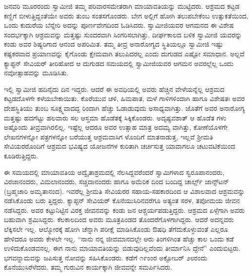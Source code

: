 ಜನವರಿ ಮೂರರಂದು ಸ್ವಾಮೀಜಿ ತಮ್ಮ ಪರಿವಾರಸಮೇತರಾಗಿ ಮಾಯಾವತಿಯನ್ನು ಮುಟ್ಟಿದರು. ಆಶ್ರಮದ ಕಟ್ಟಡ ಕಣ್ಣಿಗೆ ಬೀಳುತ್ತಿದ್ದಂತೆಯೇ ಅವರು ತುಂಬ ಸಂತಸಗೊಂಡರು. ಬೇಗ ಅಲ್ಲಿಗೆ ಹೋಗಿ ತಲುಪಬೇಕೆಂಬ ಉತ್ಸುಕತೆಯಿಂದ, ಒಂದು ಕುದುರೆಯ ಬೆನ್ನೇರಿ ಅದನ್ನು ಪೂರ್ಣವೇಗದಿಂದ ಓಡಿಸಿದರು. ಸ್ವಾಮೀಜಿಯವರ ಆಗಮನದ ಈ ವಿಶೇಷ ಸಂದರ್ಭಕ್ಕಾಗಿ ಆಶ್ರಮವನ್ನು ಮತ್ತಷ್ಟು ಸುಂದರವಾಗಿ ಸಿಂಗರಿಸಲಾಗಿತ್ತು. ದೀರ್ಘಕಾಲದ ಬಳಿಕ ಸ್ವಾಮೀಜಿ ಯವರನ್ನು ಕಂಡು ಅವರ ಶಿಷ್ಯರಿಗಾದ ಆನಂದ ಅಪರಿಮಿತ. ತಮ್ಮ ತೀವ್ರ ಅನಾರೋಗ್ಯದ ಸ್ಥಿತಿಯಲ್ಲೂ ಸ್ವಾಮೀಜಿ ಇಷ್ಟು ಕಷ್ಟಕರವಾದ ಪ್ರಯಾಣವನ್ನು ಕೈಗೊಂಡು ಕ್ಷೇಮವಾಗಿ ತಲುಪಿದರಲ್ಲ ಎಂದು ದುಗುಡದ ಎಷ್ಟೋ ಸಮಾಧಾನ. ಅಲ್ಲದೆ ಕ್ಯಾಪ್ಟನ್ ಸೇವಿಯರ್ ತೀರಿಹೋದ ಆ ದುಗುಡದ ಸಮಯದಲ್ಲಿ ಸ್ವಾಮೀಜಿಯವರ ಆಗಮನ ಅವರಲ್ಲೆಲ್ಲ ಒಂದು ನವೋತ್ಸಾಹವನ್ನು ಮೂಡಿಸಿತು.

ಇಲ್ಲಿ ಸ್ವಾಮೀಜಿ ಹದಿನೈದು ದಿನ ಇದ್ದರು. ಆದರೆ ಈ ಅವಧಿಯಲ್ಲಿ ಅವರು ಹೆಚ್ಚಿನ ವೇಳೆಯನ್ನೆಲ್ಲ ಆಶ್ರಮದ ಕಟ್ಟಡದೊಳಗೇ ಕಳೆಯಬೇಕಾಯಿತು. ಕೊರೆಯುವ ಚಳಿ, ಹಿಮಪಾತ, ಮಳೆ ಗಾಳಿಗಳಿಂದಾಗಿ ಹಾಗೂ ವಿಶೇಷತಃ ಅವರ ದೇಹಸ್ಥಿತಿಯು ತುಂಬ ಸೂಕ್ಷ್ಮವಾದದ್ದ ರಿಂದಾಗಿ ಹೆಚ್ಚು ಓಡಾಡುವುದು ಅಸಾಧ್ಯವಾಗಿತ್ತು. ಜೊತೆಗೆ ಅವರ ಅನಾರೋಗ್ಯ ಮತ್ತಷ್ಟು ಹದಗೆಟ್ಟು ಹಲವಾರು ಸಲ ಆಸ್ತಮಾ ಹೊಡೆತಕ್ಕೆ ಸಿಕ್ಕಿಕೊಂಡರು. ಅದೃಷ್ಟವಶಾತ್ ಆ ಹೊಡೆತ ಗಳು ಅಷ್ಟೊಂದು ತೀವ್ರವಾಗಿರಲಿಲ್ಲ. ಇಷ್ಟೆಲ್ಲ ಆದರೂ ಅವರ ಉತ್ಸಾಹ ಮಾತ್ರ ಅದಮ್ಯ ವಾಗಿತ್ತು, ಕೋಣೆಯೊಳಗೇ ಲೇಖನಗಳನ್ನೋ ಪತ್ರಗಳನ್ನೋ ಬರೆಯುತ್ತ ಆಶ್ರಮವಾಸಿಗ ಳೊಂದಿಗೆ ಮಾತನಾಡುತ್ತ, ಇಲ್ಲವೆ ಶ್ರೀಮತಿ ಸೇವಿಯರರೊಂದಿಗೆ ಆಶ್ರಮದ ಭವಿಷ್ಯದ ಯೋಜನೆಗಳ ಕುರಿತಾಗಿ ಚರ್ಚಿಸುತ್ತ ಯಾವಾಗಲೂ ಚಟುವಟಿಕೆಯಿಂದ ಕೂಡಿರುತ್ತಿದ್ದರು.

ಈ ಸಮಯದಲ್ಲಿ ಮಾಯಾವತಿಯ ಅದ್ವೈತಾಶ್ರಮದಲ್ಲಿ ನೆಲಸಿದ್ದವರೆಂದರೆ ಸ್ವಾಮಿಗಳಾದ ಸ್ವರೂಪಾನಂದರು, ವಿರಜಾನಂದರು, ವಿಮಲಾನಂದರು, ಸಚ್ಚಿದಾನಂದರು ಹಾಗೂ ಅಮೆರಿಕ ದಿಂದ ಬಂದಿದ್ದ ಚಾರ್ಲ್ಸ್ ಜಾನ್ಸ್​ಟನ್ (ಬ್ರಹ್ಮಚಾರಿ ಅಮೃತಾನಂದ). ಇವರೆಲ್ಲ ಶ್ರೀಮತಿ ಸೇವಿಯರರ ಸಹಾಯ-ಸಹಕಾರದಿಂದ ಆ ವಿಶಾಲವಾದ ಆಶ್ರಮವನ್ನು ನಡೆಸಿಕೊಂಡು ಬರು ತ್ತಿದ್ದರು. ಕ್ಯಾಪ್ಟನ್ ಸೇವಿಯರ್ ಕೊನೆಯುಸಿರಿನವರೆಗೂ ಅತ್ಯಂತ ಸರಳ, ತಪೋಮಯ ಜೀವನ ನಡೆಸಿದ್ದರು. ಅವರ ಕಟ್ಟುನಿಟ್ಟಿನ ವಿರಕ್ತ ಜೀವನವನ್ನು ಕಂಡು ಜನ ಆಶ್ಚರ್ಯಪಡುತ್ತಿದ್ದರು. ಆಶ್ರಮದ ಏಳ್ಗೆಗಾಗಿ ಅವರು ಬಹುವಾಗಿ ಶ್ರಮಿಸಿದ್ದರು. ಕೆಲಕಾಲದಿಂದ ಅವರು ಮೂತ್ರಪಿಂಡದ ತೊಂದರೆಗೊಳಗಾಗಿದ್ದರು. ಆದರೆ ಅದನ್ನವರು ಲೆಕ್ಕಿಸಲೇ ಇಲ್ಲ. ಆಲ್ಮೋರಕ್ಕೆ ಹೋಗಿ ಚೆನ್ನಾಗಿ ಪರೀಕ್ಷೆ ಮಾಡಿಸಿಕೊಂಡು ಔಷಧಿ ತೆಗೆದುಕೊಳ್ಳುವಂತೆ ಎಲ್ಲರೂ ಹೇಳಿದರೂ ಅವರು ಕೇಳಲೇ ಇಲ್ಲ. “ನಾನು ನನ್ನ ಜೀವಮಾನದಲ್ಲೇ ಆರು ತಿಂಗಳಿಗಿಂತ ಹೆಚ್ಚು ಕಾಲ ಒಂದು ಕಡೆ ಉಳಿದುಕೊಂಡವನಲ್ಲ. ಈಗ ನಾನು ಮಾಯಾವತಿಯನ್ನು ಬಿಡುವುದಿಲ್ಲವೆಂದು ತೀರ್ಮಾನಿಸಿ ದ್ದೇನೆ” ಎಂದುಬಿಟ್ಟರು. ಭಗವನ್ನಾಮವನ್ನು ಜಪಿಸುತ್ತ ನೋವನ್ನು ಸಹಿಸಿಕೊಂಡರು. ಕಡೆಗೆ ೧೯ಂಂರ ಅಕ್ಟೋಬರ್ ೨೮ರಂದು ಕೊನೆಯುಸಿರೆಳೆದರು. ತಮ್ಮ ಗುರುವಿನ ಕಾರ್ಯಕ್ಕಾಗಿ ಜೀವವನ್ನೇ ಸಮರ್ಪಿಸಿದರು.

